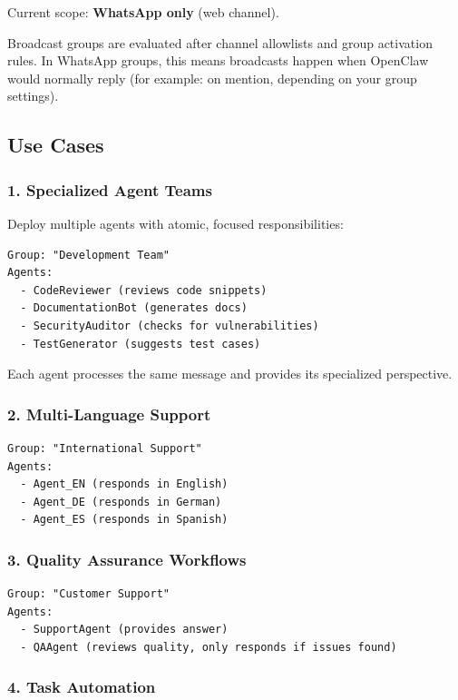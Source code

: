 Current scope: \textbf{WhatsApp only} (web channel).

Broadcast groups are evaluated after channel allowlists and group activation rules. In WhatsApp groups, this means broadcasts happen when OpenClaw would normally reply (for example: on mention, depending on your group settings).

\subsection{Use Cases}


\subsubsection{1. Specialized Agent Teams}


Deploy multiple agents with atomic, focused responsibilities:

\begin{lstlisting}
Group: "Development Team"
Agents:
  - CodeReviewer (reviews code snippets)
  - DocumentationBot (generates docs)
  - SecurityAuditor (checks for vulnerabilities)
  - TestGenerator (suggests test cases)
\end{lstlisting}


Each agent processes the same message and provides its specialized perspective.

\subsubsection{2. Multi-Language Support}


\begin{lstlisting}
Group: "International Support"
Agents:
  - Agent_EN (responds in English)
  - Agent_DE (responds in German)
  - Agent_ES (responds in Spanish)
\end{lstlisting}


\subsubsection{3. Quality Assurance Workflows}


\begin{lstlisting}
Group: "Customer Support"
Agents:
  - SupportAgent (provides answer)
  - QAAgent (reviews quality, only responds if issues found)
\end{lstlisting}


\subsubsection{4. Task Automation}


